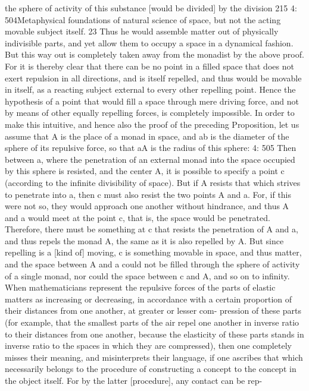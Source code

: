 the sphere of activity of this substance [would be divided] by the division
215
4: 504Metaphysical foundations of natural science
of space, but not the acting movable subject itself. 23 Thus he would
assemble matter out of physically indivisible parts, and yet allow them
to occupy a space in a dynamical fashion.
But this way out is completely taken away from the monadist by the
above proof. For it is thereby clear that there can be no point in a ﬁlled
space that does not exert repulsion in all directions, and is itself repelled,
and thus would be movable in itself, as a reacting subject external to
every other repelling point. Hence the hypothesis of a point that would
ﬁll a space through mere driving force, and not by means of other equally
repelling forces, is completely impossible. In order to make this intuitive,
and hence also the proof of the preceding Proposition, let us assume that
A is the place of a monad in space, and ab is the diameter of the sphere
of its repulsive force, so that aA is the radius of this sphere:
4: 505
Then between a, where the penetration of an external monad into the
space occupied by this sphere is resisted, and the center A, it is possible
to specify a point c (according to the inﬁnite divisibility of space). But
if A resists that which strives to penetrate into a, then c must also resist
the two points A and a. For, if this were not so, they would approach
one another without hindrance, and thus A and a would meet at the
point c, that is, the space would be penetrated. Therefore, there must
be something at c that resists the penetration of A and a, and thus repels
the monad A, the same as it is also repelled by A. But since repelling is
a [kind of] moving, c is something movable in space, and thus matter,
and the space between A and a could not be ﬁlled through the sphere of
activity of a single monad, nor could the space between c and A, and so
on to inﬁnity.
When mathematicians represent the repulsive forces of the parts of
elastic matters as increasing or decreasing, in accordance with a certain
proportion of their distances from one another, at greater or lesser com-
pression of these parts (for example, that the smallest parts of the air
repel one another in inverse ratio to their distances from one another,
because the elasticity of these parts stands in inverse ratio to the spaces in
which they are compressed), then one completely misses their meaning,
and misinterprets their language, if one ascribes that which necessarily
belongs to the procedure of constructing a concept to the concept in
the object itself. For by the latter [procedure], any contact can be rep-
